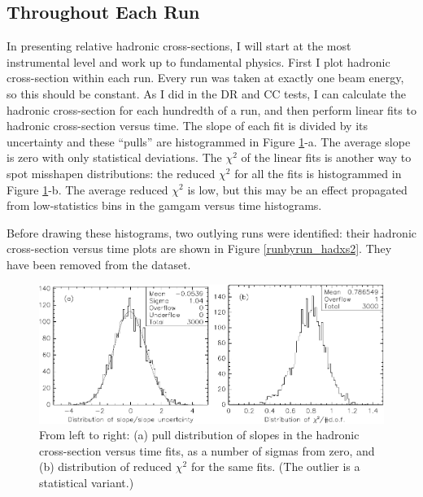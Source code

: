 \subsection{Throughout Each Run}

In presenting relative hadronic cross-sections, I will start at the
most instrumental level and work up to fundamental physics.  First I
plot hadronic cross-section within each run.  Every run was taken at
exactly one beam energy, so this should be constant.  As I did in the
DR and CC tests, I can calculate the hadronic cross-section for each
hundredth of a run, and then perform linear fits to hadronic
cross-section versus time.  The slope of each fit is divided by its
uncertainty and these ``pulls'' are histogrammed in Figure
\ref{runbyrun_hadxs1}-a.  The average slope is zero with only
statistical deviations.  The $\chi^2$ of the linear fits is another
way to spot misshapen distributions: the reduced $\chi^2$ for all the
fits is histogrammed in Figure
\ref{runbyrun_hadxs1}-b.  The average reduced $\chi^2$ is low, but
this may be an effect propagated from low-statistics bins in the
gamgam versus time histograms.

Before drawing these histograms, two outlying runs were identified:
their hadronic cross-section versus time plots are shown in Figure
\ref{runbyrun_hadxs2}.  They have been removed from the dataset.

\begin{figure}[p]
  \includegraphics[width=\linewidth]{plots/runbyrun_hadxs1}
  \caption{\label{runbyrun_hadxs1} From left to right: (a) pull
  distribution of slopes in the hadronic cross-section versus time
  fits, as a number of sigmas from zero, and (b) distribution of
  reduced $\chi^2$ for the same fits.  (The outlier is a statistical
  variant.)}
\end{figure}

